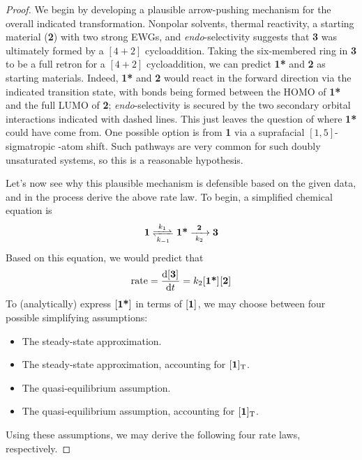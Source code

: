 \documentclass[../psets.tex]{subfiles}
\begin{document}
\begin{enumerate}
\begin{enumerate}
\begin{proof}
            We begin by developing a plausible arrow-pushing mechanism for the overall indicated transformation. Nonpolar solvents, thermal reactivity, a starting material (\textbf{2}) with two strong EWGs, and \emph{endo}-selectivity suggests that \textbf{3} was ultimately formed by a $[4+2]$ cycloaddition. Taking the six-membered ring in \textbf{3} to be a full retron for a $[4+2]$ cycloaddition, we can predict \textbf{1*} and \textbf{2} as starting materials. Indeed, \textbf{1*} and \textbf{2} would react in the forward direction via the indicated transition state, with bonds being formed between the HOMO of \textbf{1*} and the full LUMO of \textbf{2}; \emph{endo}-selectivity is secured by the two secondary orbital interactions indicated with dashed lines. This just leaves the question of where \textbf{1*} could have come from. One possible option is from \textbf{1} via a suprafacial $[1,5]$-sigmatropic -atom shift. Such pathways are very common for such doubly unsaturated systems, so this is a reasonable hypothesis.\par
            Let's now see why this plausible mechanism is defensible based on the given data, and in the process derive the above rate law. To begin, a simplified chemical equation is
            \begin{equation*}
                \ce{\textbf{1} <=>[$k_1$][$k_{-1}$] \textbf{1*} ->[\textbf{2}][$k_2$] \textbf{3}}
            \end{equation*}
            Based on this equation, we would predict that
            \begin{equation*}
                \rate = \dv{\cnc{\textbf{3}}}{t} = k_2\cnc{\textbf{1*}}\cnc{\textbf{2}}
            \end{equation*}
            To (analytically) express $\cnc{\textbf{1*}}$ in terms of $\cnc{\textbf{1}}$, we may choose between four possible simplifying assumptions:
            \begin{itemize}
                \item The steady-state approximation.
                \item The steady-state approximation, accounting for $\cnc[T]{\textbf{1}}$.
                \item The quasi-equilibrium assumption.
                \item The quasi-equilibrium assumption, accounting for $\cnc[T]{\textbf{1}}$.
            \end{itemize}
            Using these assumptions, we may derive the following four rate laws, respectively.

\end{proof}
\end{enumerate}
\end{enumerate}
\end{document}
